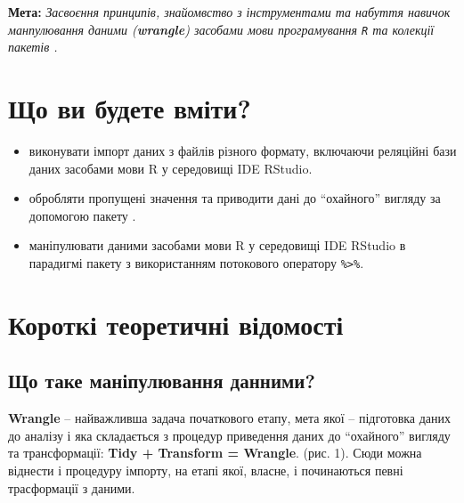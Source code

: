 \documentclass[
]{book}
\providecommand{\tightlist}{%
  \setlength{\itemsep}{0pt}\setlength{\parskip}{0pt}}
\begin{document}
\textbf{Мета:} \emph{Засвоєння принципів, знайомвство з інструментами та набуття навичок манпулювання даними (\textbf{wrangle}) засобами мови програмування \texttt{R} та колекції пакетів \citep{R-tidyverse}.}

\hypertarget{ux449ux43e-ux432ux438-ux431ux443ux434ux435ux442ux435-ux432ux43cux456ux442ux438-1}{%
\section{Що ви будете вміти?}\label{ux449ux43e-ux432ux438-ux431ux443ux434ux435ux442ux435-ux432ux43cux456ux442ux438-1}}

\begin{itemize}
\tightlist
\item
  виконувати імпорт даних з файлів різного формату, включаючи реляційні бази даних засобами мови R у середовищі IDE RStudio.
\item
  обробляти пропущені значення та приводити дані до ``охайного'' вигляду за допомогою пакету \citep{R-tidyr}.
\item
  маніпулювати даними засобами мови R у середовищі IDE RStudio в парадигмі пакету \citep{R-dplyr} з використанням потокового оператору \texttt{\%\textgreater{}\%}.
\end{itemize}

\hypertarget{ux43aux43eux440ux43eux442ux43aux456-ux442ux435ux43eux440ux435ux442ux438ux447ux43dux456-ux432ux456ux434ux43eux43cux43eux441ux442ux456-1}{%
\section{Короткі теоретичні відомості}\label{ux43aux43eux440ux43eux442ux43aux456-ux442ux435ux43eux440ux435ux442ux438ux447ux43dux456-ux432ux456ux434ux43eux43cux43eux441ux442ux456-1}}

\hypertarget{ux449ux43e-ux442ux430ux43aux435-ux43cux430ux43dux456ux43fux443ux43bux44eux432ux430ux43dux43dux44f-ux434ux430ux43dux43dux438ux43cux438}{%
\subsection{Що таке маніпулювання данними?}\label{ux449ux43e-ux442ux430ux43aux435-ux43cux430ux43dux456ux43fux443ux43bux44eux432ux430ux43dux43dux44f-ux434ux430ux43dux43dux438ux43cux438}}

\textbf{Wrangle} -- найважливша задача початкового етапу, мета якої -- підготовка даних до аналізу і яка складається з процедур приведення даних до ``охайного'' вигляду та трансформації: \textbf{Tidy + Transform = Wrangle}. \citep{r4ds} (рис. 1). Сюди можна віднести і процедуру імпорту, на етапі якої, власне, і починаються певні трасформації з даними.
\end{document}
